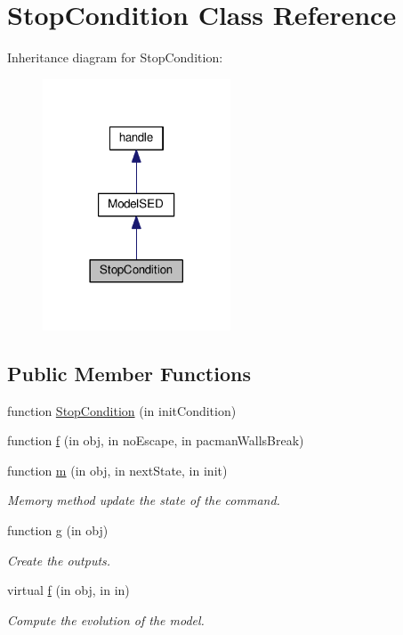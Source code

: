 \hypertarget{class_stop_condition}{}\section{Stop\+Condition Class Reference}
\label{class_stop_condition}


Inheritance diagram for Stop\+Condition\+:\nopagebreak
\begin{figure}[H]
\begin{center}
\leavevmode
\includegraphics[width=158pt]{class_stop_condition__inherit__graph}
\end{center}
\end{figure}
\subsection*{Public Member Functions}
\begin{DoxyCompactItemize}
\item 
function \hyperlink{class_stop_condition_a998151731b2f85cb0f3e0cbc7d82bf96}{Stop\+Condition} (in init\+Condition)
\item 
function \hyperlink{class_stop_condition_abcffcbb16870f569058af2fd7823c5dd}{f} (in obj, in no\+Escape, in pacman\+Walls\+Break)
\item 
function \hyperlink{class_stop_condition_a3140f24c6c4b80037b7d4f521c6ae2d3}{m} (in obj, in next\+State, in init)
\begin{DoxyCompactList}\small\item\em Memory method update the state of the command. \end{DoxyCompactList}\item 
function \hyperlink{class_stop_condition_a07dadfabe92bf9a144b8a862720e7746}{g} (in obj)
\begin{DoxyCompactList}\small\item\em Create the outputs. \end{DoxyCompactList}\item 
virtual \hyperlink{class_model_s_e_d_ac36f9451c43b120828af4380858f2024}{f} (in obj, in in)
\begin{DoxyCompactList}\small\item\em Compute the evolution of the model. \end{DoxyCompactList}\end{DoxyCompactItemize}
